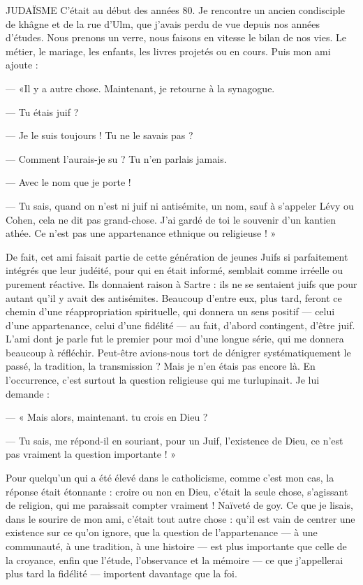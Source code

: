 {JUDAÏSME C'était au début des années 80. Je rencontre un ancien
condisciple de khâgne et de la rue d’Ulm, que j'avais perdu de
vue depuis nos années d’études. Nous prenons un verre, nous faisons en vitesse
le bilan de nos vies. Le métier, le mariage, les enfants, les livres projetés ou en
cours. Puis mon ami ajoute :

— «Il y a autre chose. Maintenant, je retourne à la synagogue.

— Tu étais juif ?

— Je le suis toujours ! Tu ne le savais pas ?

— Comment l’aurais-je su ? Tu n’en parlais jamais.

— Avec le nom que je porte !

— Tu sais, quand on n’est ni juif ni antisémite, un nom, sauf à s'appeler
Lévy ou Cohen, cela ne dit pas grand-chose. J'ai gardé de toi le souvenir d’un
kantien athée. Ce n’est pas une appartenance ethnique ou religieuse ! »

De fait, cet ami faisait partie de cette génération de jeunes Juifs si parfaitement
intégrés que leur judéité, pour qui en était informé, semblait comme
irréelle ou purement réactive. Ils donnaient raison à Sartre : ils ne se sentaient
juifs que pour autant qu’il y avait des antisémites. Beaucoup d’entre eux, plus
tard, feront ce chemin d’une réappropriation spirituelle, qui donnera un sens
positif — celui d’une appartenance, celui d’une fidélité — au fait, d’abord contingent,
d’être juif. L’ami dont je parle fut le premier pour moi d’une longue série,
qui me donnera beaucoup à réfléchir. Peut-être avions-nous tort de dénigrer
systématiquement le passé, la tradition, la transmission ? Mais je n’en étais pas
encore là. En l'occurrence, c’est surtout la question religieuse qui me turlupinait.
Je lui demande :

— « Mais alors, maintenant. tu crois en Dieu ?

— Tu sais, me répond-il en souriant, pour un Juif, l'existence de Dieu, ce
n’est pas vraiment la question importante ! »

Pour quelqu'un qui a été élevé dans le catholicisme, comme c’est mon
cas, la réponse était étonnante : croire ou non en Dieu, c'était la seule chose,
s'agissant de religion, qui me paraissait compter vraiment ! Naïveté de goy.
Ce que je lisais, dans le sourire de mon ami, c’était tout autre chose : qu’il est
vain de centrer une existence sur ce qu’on ignore, que la question de l’appartenance
— à une communauté, à une tradition, à une histoire — est plus
importante que celle de la croyance, enfin que l'étude, l’observance et la
mémoire — ce que j’appellerai plus tard la fidélité — importent davantage que
la foi.

}
